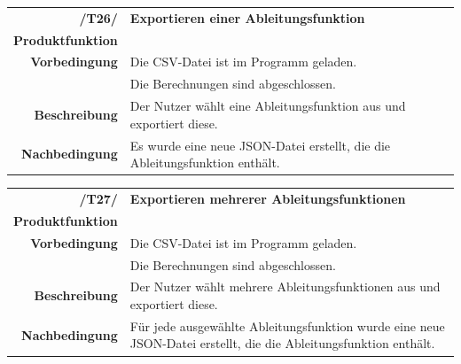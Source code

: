 \documentclass{article}
\begin{document}
\begin{table}[H]
\begin{tabularx}{\textwidth}{rX} \vspace{1mm}
\textbf{/T26/}         & \textbf{Exportieren einer Ableitungsfunktion}  \\ \vspace{1mm}
\textbf{Produktfunktion} & \nameref{sec:f:Attributsableitungen exportieren} \\
\textbf{Vorbedingung}  & Die CSV-Datei ist im Programm geladen. \\ \vspace{1mm} & Die Berechnungen sind abgeschlossen.   \\ \vspace{1mm}
\textbf{Beschreibung}  & Der Nutzer wählt eine Ableitungsfunktion aus und exportiert diese. \\
\textbf{Nachbedingung} & Es wurde eine neue JSON-Datei erstellt, die die Ableitungsfunktion enthält.
\end{tabularx}
\end{table}

\begin{table}[H]
\begin{tabularx}{\textwidth}{rX} \vspace{1mm}
\textbf{/T27/}         & \textbf{Exportieren mehrerer Ableitungsfunktionen}  \\ \vspace{1mm}
\textbf{Produktfunktion} & \nameref{sec:f:Attributsableitungen exportieren} \\
\textbf{Vorbedingung}  & Die CSV-Datei ist im Programm geladen. \\ \vspace{1mm} & Die Berechnungen sind abgeschlossen.   \\ \vspace{1mm}
\textbf{Beschreibung}  & Der Nutzer wählt mehrere Ableitungsfunktionen aus und exportiert diese. \\
\textbf{Nachbedingung} & Für jede ausgewählte Ableitungsfunktion wurde eine neue JSON-Datei erstellt, die die Ableitungsfunktion enthält.
\end{tabularx}
\end{table}
\end{document}
